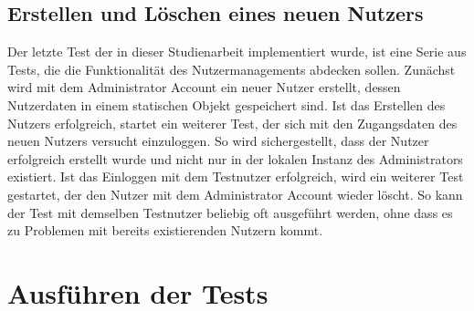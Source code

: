 \subsection{Erstellen und Löschen eines neuen Nutzers}

Der letzte Test der in dieser Studienarbeit implementiert wurde, ist eine Serie aus Tests, die die Funktionalität des Nutzermanagements abdecken sollen.
Zunächst wird mit dem Administrator Account ein neuer Nutzer erstellt, dessen Nutzerdaten in einem statischen Objekt gespeichert sind.
Ist das Erstellen des Nutzers erfolgreich, startet ein weiterer Test, der sich mit den Zugangsdaten des neuen Nutzers versucht einzuloggen.
So wird sichergestellt, dass der Nutzer erfolgreich erstellt wurde und nicht nur in der lokalen Instanz des Administrators existiert.
Ist das Einloggen mit dem Testnutzer erfolgreich, wird ein weiterer Test gestartet, der den Nutzer mit dem Administrator Account wieder löscht.
So kann der Test mit demselben Testnutzer beliebig oft ausgeführt werden, ohne dass es zu Problemen mit bereits existierenden Nutzern kommt.

\section{Ausführen der Tests}

